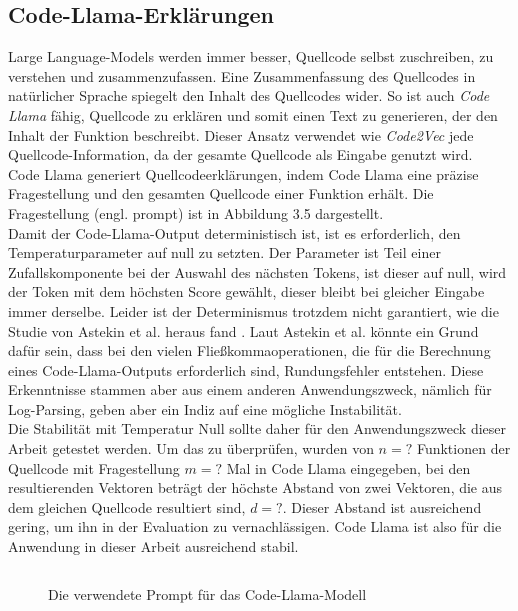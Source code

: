 \documentclass[12pt,letterpaper,ngerman]{article}
\begin{document}
\subsection{Code-Llama-Erklärungen}
Large Language-Models werden immer besser, Quellcode selbst
zuschreiben, zu verstehen und zusammenzufassen. Eine Zusammenfassung des Quellcodes
in natürlicher Sprache spiegelt den Inhalt des Quellcodes wider.
So ist auch \textit{Code Llama} fähig, Quellcode zu erklären und
somit einen Text zu generieren, der den Inhalt der Funktion 
beschreibt. Dieser Ansatz verwendet wie \textit{Code2Vec} 
jede Quellcode-Information, da der 
gesamte Quellcode als Eingabe genutzt wird.\\
Code Llama generiert Quellcodeerklärungen, indem Code Llama eine präzise 
Fragestellung und den gesamten Quellcode einer Funktion erhält.
Die Fragestellung (engl. prompt) ist in Abbildung 3.5 dargestellt.\\
Damit der Code-Llama-Output deterministisch ist,
ist es erforderlich, den Temperaturparameter auf null zu setzten. 
Der Parameter ist Teil einer Zufallskomponente bei der
Auswahl des nächsten Tokens, ist dieser auf null,
wird der Token mit dem höchsten Score gewählt, dieser 
bleibt bei gleicher Eingabe immer derselbe. Leider ist der
Determinismus trotzdem nicht garantiert, 
wie die Studie von Astekin et al. heraus fand
\cite{llmstable}. Laut Astekin et al. könnte ein Grund dafür sein,
dass bei den vielen Fließkommaoperationen, die für die Berechnung
eines Code-Llama-Outputs erforderlich sind,
Rundungsfehler entstehen. Diese Erkenntnisse stammen aber 
aus einem anderen Anwendungszweck, nämlich für Log-Parsing, 
geben aber ein Indiz auf eine mögliche Instabilität.\\
Die Stabilität mit Temperatur Null sollte daher für den
Anwendungszweck dieser Arbeit getestet werden. Um das zu
überprüfen, wurden von $n = ?$ Funktionen der Quellcode mit 
Fragestellung $m = ?$ Mal in Code Llama eingegeben, bei den 
resultierenden Vektoren beträgt der höchste Abstand von zwei 
Vektoren, die aus dem gleichen Quellcode resultiert sind, $d = ?$.
Dieser Abstand ist ausreichend gering, um ihn in der Evaluation 
zu vernachlässigen. Code Llama ist also für die Anwendung 
in dieser Arbeit ausreichend stabil.
\begin{figure}
  \begin{center}
    \begin{minipage}[c]{6cm}
        \centering
        \inputminted[fontsize=\small]{python}{prompt.py}
    \end{minipage}
  \end{center}
  \caption{Die verwendete Prompt für das Code-Llama-Modell }
\end{figure}
\pagebreak
\end{document}

